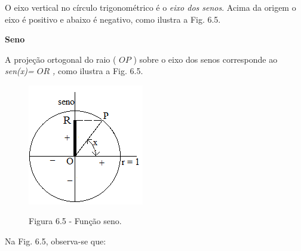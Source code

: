 O eixo vertical no círculo trigonométrico é o \textit{eixo dos senos}. Acima da origem o eixo é positivo e abaixo é negativo, como ilustra a Fig. 6.5.

\begin{multicols}{2}

\begin{caixa}
\textbf{Seno }

A projeção ortogonal do raio ( \( OP \) ) sobre o eixo dos senos corresponde ao \textit{sen(x)= \(  OR \) , }como ilustra a Fig. 6.5.
\end{caixa}

\begin{figure}[H]
    \begin{Center}
        \includegraphics[width=1.99in,height=2.07in]{capitulos/trigonometria_e_funcoes_trigonometricas/media/image34.png}
    
        Figura 6.5 - Função seno.
    \end{Center}
\end{figure}

\end{multicols}

Na Fig. 6.5, observa-se que:

